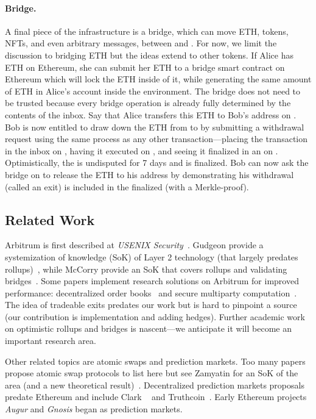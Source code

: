 \paragraph{Bridge.} A final piece of the \layertwo infrastructure is a bridge, which can move ETH, tokens, NFTs, and even arbitrary messages, between \layerone and \layertwo. For now, we limit the discussion to bridging ETH but the ideas extend to other tokens. If Alice has ETH on Ethereum, she can submit her ETH to a bridge smart contract on Ethereum which will lock the ETH inside of it, while generating the same amount of ETH in Alice's account inside the \layertwo environment. The bridge does not need to be trusted because every bridge operation is already fully determined by the contents of the inbox. Say that Alice transfers this ETH to Bob's address on \layertwo. Bob is now entitled to draw down the ETH from \layertwo to \layerone by submitting a withdrawal request using the same process as any other \layertwo transaction---\ie placing the transaction in the inbox on \layerone, having it executed on \layertwo, and seeing it finalized in an \rblock on \layerone. Optimistically, the \rblock is undisputed for 7 days and is finalized. Bob can now ask the bridge on \layerone to release the ETH to his address by demonstrating his withdrawal (called an exit) is included in the finalized \rblock (\eg with a Merkle-proof).

\subsection{Related Work} 

Arbitrum is first described at \textit{USENIX Security}~\cite{kalodner2018arbitrum}. Gudgeon \etal provide a systemization of knowledge (SoK) of Layer 2 technology (that largely predates rollups)~\cite{gudgeon2019sok}, while McCorry \etal provide an SoK that covers rollups and validating bridges~\cite{mccorry2021sok}. Some papers implement research solutions on Arbitrum for improved performance:  decentralized order books~\cite{moosavi2021lissy} and secure multiparty computation~\cite{demirag2021absentia}. The idea of tradeable exits predates our work but is hard to pinpoint a source (our contribution is implementation and adding hedges). Further academic work on optimistic rollups and bridges is nascent---we anticipate it will become an important research area.  

Other related topics are atomic swaps and prediction markets. Too many papers propose atomic swap protocols to list here but see Zamyatin \etal for an SoK of the area (and a new theoretical result)~\cite{zamyatin2021sok}. Decentralized prediction markets proposals predate Ethereum and include Clark \etal~\cite{clark2014decentralizing} and Truthcoin~\cite{sztorc2015truthcoin}. Early Ethereum projects \textit{Augur} and \textit{Gnosis} began as prediction markets. 

